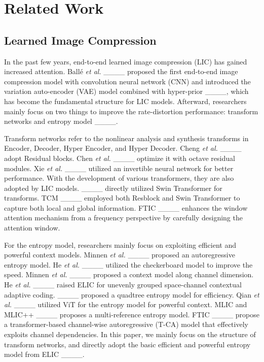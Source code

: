 \section{Related Work}
\label{sec:Related work}
\subsection{Learned Image Compression}





In the past few years, end-to-end learned image compression (LIC) has gained increased attention. Ball\'{e} \textit{et al.} ____ proposed the first end-to-end image compression model with convolution neural network (CNN) and introduced the variation auto-encoder (VAE) model combined with hyper-prior ____, which has become the fundamental structure for LIC models. Afterward, researchers mainly focus on two things to improve the rate-distortion performance: transform networks and entropy model ____.

Transform networks refer to the nonlinear analysis and synthesis transforms in Encoder, Decoder, Hyper Encoder, and Hyper Decoder. Cheng \textit{et al.} ____ adopt Residual blocks. Chen \textit{et al.} ____ optimize it with octave residual modules. Xie  \textit{et al.} ____ utilized an invertible neural network for better performance. With the development of various transformers, they are also adopted by LIC models.  ____ directly utilized Swin Transformer for transforms. TCM  ____ employed both Resblock and Swin Transformer to capture both local and global information. FTIC  ____ enhances the window attention mechanism from a frequency perspective by carefully designing the attention window.

For the entropy model, researchers mainly focus on exploiting efficient and powerful context models.  Minnen \textit{et al.} ____ proposed an autoregressive entropy model. He \textit{et al.}  ____ utilized the checkerboard model to improve the speed. Minnen  \textit{et al.} ____ proposed a context model along channel dimension. He \textit{et al.} ____ raised ELIC for unevenly grouped space-channel contextual adaptive coding.  ____ proposed a quadtree entropy model for efficiency.
 Qian \textit{et al.} ____ utilized ViT for the entropy model for powerful context. MLIC and MLIC++  ____ proposes a multi-reference entropy model. FTIC  ____ propose a transformer-based channel-wise autoregressive (T-CA) model that effectively exploits channel dependencies. In this paper, we mainly focus on the structure of transform networks, and directly adopt the basic efficient and powerful entropy model from ELIC ____.

